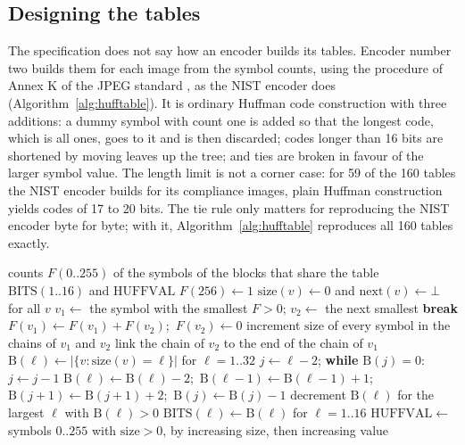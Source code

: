 \subsection{Designing the tables}

The specification does not say how an encoder builds its tables. Encoder number two builds
them for each image from the symbol counts, using the procedure of Annex K of the JPEG standard
\cite{jpeg}, as the NIST encoder does (Algorithm~\ref{alg:hufftable}). It is ordinary Huffman
code construction with three additions: a dummy symbol with count one is added so that the
longest code, which is all ones, goes to it and is then discarded; codes longer than 16 bits
are shortened by moving leaves up the tree; and ties are broken in favour of the larger symbol
value. The length limit is not a corner case: for 59 of the 160 tables the NIST encoder builds
for its compliance images, plain Huffman construction yields codes of 17 to 20 bits. The tie
rule only matters for reproducing the NIST encoder byte for byte; with it,
Algorithm~\ref{alg:hufftable} reproduces all 160 tables exactly.

\begin{algorithm}[ht]
  \caption{An optimal table from symbol counts (JPEG Annex K.2--K.4).}
  \label{alg:hufftable}
  \begin{algorithmic}[1]
    \Require counts $F(0..255)$ of the symbols of the blocks that share the table
    \Ensure $\mathrm{BITS}(1..16)$ and $\mathrm{HUFFVAL}$
    \State $F(256) \gets 1$ 
    \State $\mathrm{size}(v) \gets 0$ and $\mathrm{next}(v) \gets \bot$ for all $v$ 
    \Loop
      \State $v_1 \gets$ the symbol with the smallest $F > 0$; $v_2 \gets$ the next smallest 
       \textbf{break} \EndIf
      \State $F(v_1) \gets F(v_1) + F(v_2)$;\ $F(v_2) \gets 0$
      \State increment $\mathrm{size}$ of every symbol in the chains of $v_1$ and $v_2$
      \State link the chain of $v_2$ to the end of the chain of $v_1$
    \EndLoop
    \State $\mathrm{B}(\ell) \gets |\{v : \mathrm{size}(v) = \ell\}|$ for $\ell = 1..32$
     
        \State $j \gets \ell - 2$; \textbf{while} $\mathrm{B}(j) = 0$: $j \gets j - 1$
        \State $\mathrm{B}(\ell) \gets \mathrm{B}(\ell) - 2$;\ $\mathrm{B}(\ell-1) \gets \mathrm{B}(\ell-1) + 1$;\ $\mathrm{B}(j+1) \gets \mathrm{B}(j+1) + 2$;\ $\mathrm{B}(j) \gets \mathrm{B}(j) - 1$
      \EndWhile
    \EndFor
    \State decrement $\mathrm{B}(\ell)$ for the largest $\ell$ with $\mathrm{B}(\ell) > 0$ 
    \State $\mathrm{BITS}(\ell) \gets \mathrm{B}(\ell)$ for $\ell = 1..16$
    \State $\mathrm{HUFFVAL} \gets$ symbols $0..255$ with $\mathrm{size} > 0$, by increasing size, then increasing value
  \end{algorithmic}
\end{algorithm}
